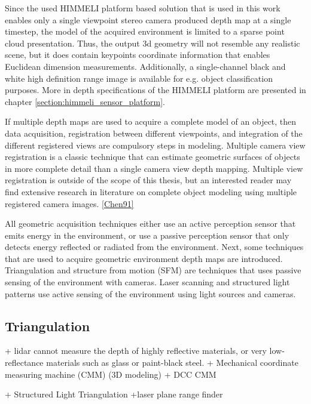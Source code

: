 \documentclass[12pt,a4paper,oneside,pdftex]{report}
\begin{document}
{Since the used HIMMELI platform based solution that is used in this work enables only a single viewpoint stereo camera produced depth map at a single timestep, the model of the acquired environment is limited to a sparse point cloud presentation. Thus, the output 3d geometry will not resemble any realistic scene, but it does contain keypoints coordinate information that enables Euclidean dimension measurements. Additionally, a single-channel black and white high definition range image is available for e.g. object classification purposes. More in depth specifications of the HIMMELI platform are presented in chapter \ref{section:himmeli_sensor_platform}.

If multiple depth maps are used to acquire a complete model of an object, then data acquisition, registration between different viewpoints, and integration of the different registered views are compulsory steps in modeling.  Multiple camera view registration is a classic technique that can estimate geometric surfaces of objects in more complete detail than a single camera view depth mapping. Multiple view registration is outside of the scope of this thesis, but an interested reader may find extensive research in literature on complete object modeling using multiple registered camera images.  \ref{Chen91}

All geometric acquisition techniques either use an active perception sensor that emits energy in the environment, or use a passive perception sensor that only detects energy reflected or radiated from the environment. Next, some techniques that are used to acquire geometric environment depth maps are introduced. Triangulation and structure from motion (SFM) are techniques that uses passive sensing of the environment with cameras. Laser scanning and structured light patterns use active sensing of the environment using light sources and cameras.  

\subsection{Triangulation}
\label{subsection:triangulation}



+ lidar cannot measure the depth of highly reflective materials, or very low-reflectance materials such as glass or paint-black steel.
+ Mechanical coordinate measuring machine (CMM) (3D modeling)
    + DCC CMM

+ Structured Light Triangulation
    +laser plane range finder

}
\end{document}

